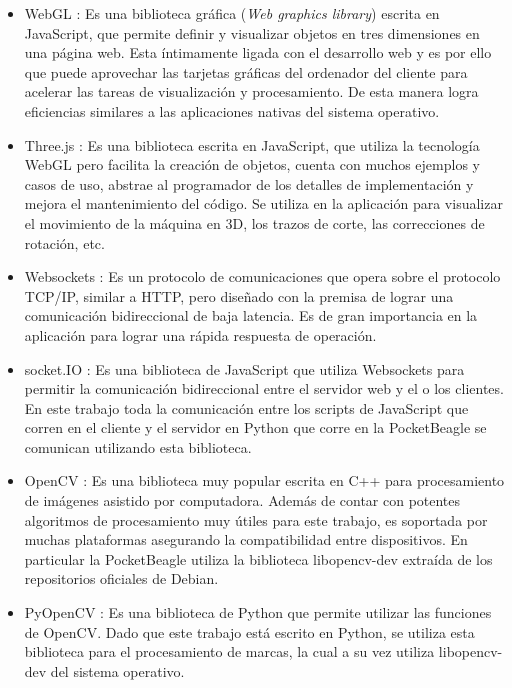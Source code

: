 \begin{itemize}
{      }
      \item{WebGL \citep{WEBSITE:webgl}: Es una biblioteca gráfica (\textit{Web graphics library}) escrita en JavaScript, que permite definir y visualizar objetos en tres dimensiones en una página web.
         Esta íntimamente ligada con el desarrollo web y es por ello que puede aprovechar las tarjetas gráficas del ordenador del cliente para acelerar las tareas de visualización y procesamiento.
         De esta manera logra eficiencias similares a las aplicaciones nativas del sistema operativo.
      }
      \item{Three.js \citep{WEBSITE:threejs}: Es una biblioteca escrita en JavaScript, que utiliza la tecnología WebGL pero facilita la creación de objetos, cuenta con muchos ejemplos y casos de uso, abstrae al programador de los detalles de implementación y mejora el mantenimiento del código.
         Se utiliza en la aplicación para visualizar el movimiento de la máquina en 3D, los trazos de corte, las correcciones de rotación, etc.
      }
      \item{Websockets \citep{WEBSITE:websockets}: Es un protocolo de comunicaciones que opera sobre el protocolo TCP/IP, similar a HTTP, pero diseñado con la premisa de lograr una comunicación bidireccional de baja latencia.
         Es de gran importancia en la aplicación para lograr una rápida respuesta de operación.
      }
      \item{socket.IO \citep{WEBSITE:socketio}: Es una biblioteca de JavaScript que utiliza Websockets para permitir la comunicación bidireccional entre el servidor web y el o los clientes.
         En este trabajo toda la comunicación entre los scripts de JavaScript que corren en el cliente y el servidor en Python que corre en la PocketBeagle se comunican utilizando esta biblioteca.
      }
   \item{OpenCV \citep{WEBSITE:opencv}: Es una biblioteca muy popular escrita en C++ para procesamiento de imágenes asistido por computadora.
         Además de contar con potentes algoritmos de procesamiento muy útiles para este trabajo, es soportada por muchas plataformas asegurando la compatibilidad entre dispositivos.
         En particular la PocketBeagle utiliza la biblioteca libopencv-dev extraída de los repositorios oficiales de Debian.
      }
   \item{PyOpenCV \citep{WEBSITE:pyopencv}: Es una biblioteca de Python que permite utilizar las funciones de OpenCV.
         Dado que este trabajo está escrito en Python, se utiliza esta biblioteca para el procesamiento de marcas, la cual a su vez utiliza libopencv-dev del sistema operativo.
      }
\end{itemize}

